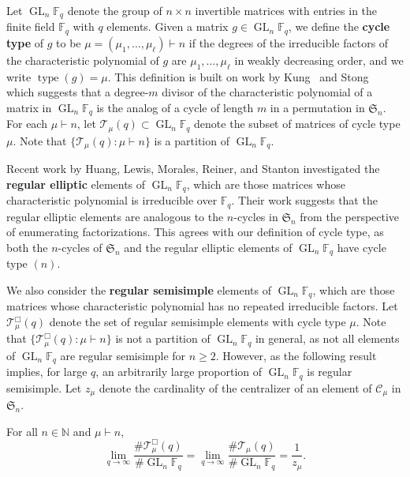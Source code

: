 \documentclass[Unicode,ALCO]{cedram}
\DeclareMathOperator{\GL}{GL}
\DeclareMathOperator{\type}{type}
\newcommand{\CC}{\mathcal{C}}
\newcommand{\F}{\mathbb{F}}
\newcommand{\N}{\mathbb{N}}
\newcommand{\FS}{\mathfrak{S}}
\newcommand{\CT}{\mathcal{T}}
\newcommand{\myemph}{\textbf}
\begin{document}
Let \(\GL_n \F_q\) denote the group of \(n \times n\) invertible matrices with entries in the finite field \(\F_q\) with \(q\) elements.
Given a matrix \(g \in \GL_n \F_q\), we define the \myemph{cycle type} of \(g\) to be \(\mu = (\mu_1,\ldots,\mu_\ell) \vdash n\) if the degrees of the irreducible factors of the characteristic polynomial of \(g\) are \(\mu_1,\ldots,\mu_\ell\) in weakly decreasing order, and we write \(\type (g) = \mu\).
This definition is built on work by Kung~\cite{kung} and Stong~\cite{stong} which suggests that a degree-\(m\) divisor of the characteristic polynomial of a matrix in \(\GL_n \F_q\) is the analog of a cycle of length \(m\) in a permutation in \(\FS_n\).
For each \(\mu \vdash n\), let \(\CT_\mu (q) \subset \GL_n \F_q\) denote the subset of matrices of cycle type \(\mu\).
Note that \(\{\CT_\mu (q) : \mu \vdash n\}\) is a partition of \(\GL_n \F_q\).

Recent work by Huang, Lewis, Morales, Reiner, and Stanton \cite{HLR, LM, refl_fact} investigated the \myemph{regular elliptic} elements of \(\GL_n \F_q\), which are those matrices whose characteristic polynomial is irreducible over \(\F_q\).
Their work suggests that the regular elliptic elements are analogous to the \(n\)-cycles in \(\FS_n\) from the perspective of enumerating factorizations.
This agrees with our definition of cycle type, as both the \(n\)-cycles of \(\FS_n\) and the regular elliptic elements of \(\GL_n \F_q\) have cycle type \((n)\).







We also consider the \myemph{regular semisimple} elements of \(\GL_n \F_q\), which are those matrices whose characteristic polynomial has no repeated irreducible factors.
Let \(\CT_\mu^\Box (q)\) denote the set of regular semisimple elements with cycle type \(\mu\).
Note that \(\{\CT_\mu^\Box (q) : \mu \vdash n\}\) is not a partition of \(\GL_n \F_q\) in general, as not all elements of \(\GL_n \F_q\) are regular semisimple for \(n \geq 2\).
However, as the following result implies, for large \(q\), an arbitrarily large proportion of \(\GL_n \F_q\) is regular semisimple.
Let \(z_\mu\) denote the cardinality of the centralizer of an element of \(\CC_\mu\) in \(\FS_n\).

\begin{corollary}
\label{cycle_type_ratio_limit}
For all \(n \in \N\) and \(\mu \vdash n\),
\label{dense}
\[
\lim_{q \to \infty} \frac{\# \CT_\mu^\Box (q)}{\# \GL_n \F_q} = \lim_{q \to \infty} \frac{\# \CT_\mu (q)}{\# \GL_n \F_q} = \frac{1}{z_\mu}.
\]
\end{corollary}
\end{document}
